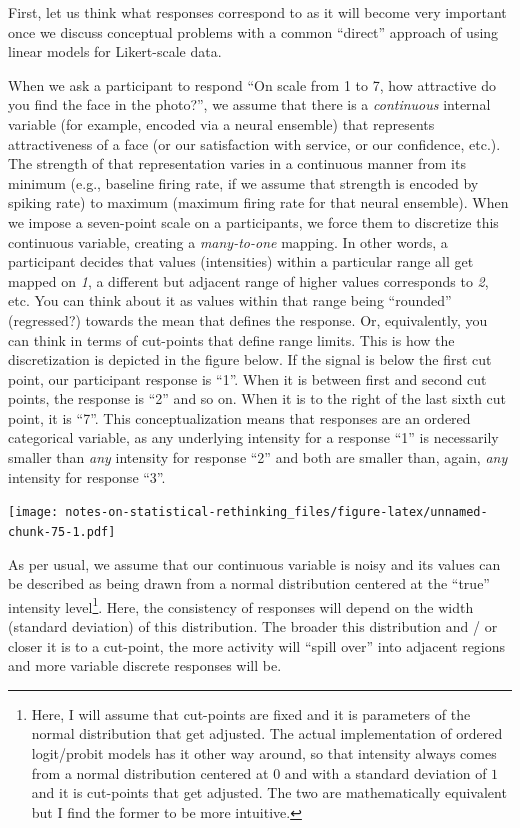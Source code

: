 \documentclass[
]{book}
\begin{document}
First, let us think what responses correspond to as it will become very important once we discuss conceptual problems with a common ``direct'' approach of using linear models for Likert-scale data.

When we ask a participant to respond ``On scale from 1 to 7, how attractive do you find the face in the photo?'', we assume that there is a \emph{continuous} internal variable (for example, encoded via a neural ensemble) that represents attractiveness of a face (or our satisfaction with service, or our confidence, etc.). The strength of that representation varies in a continuous manner from its minimum (e.g., baseline firing rate, if we assume that strength is encoded by spiking rate) to maximum (maximum firing rate for that neural ensemble). When we impose a seven-point scale on a participants, we force them to discretize this continuous variable, creating a \emph{many-to-one} mapping. In other words, a participant decides that values (intensities) within a particular range all get mapped on \emph{1}, a different but adjacent range of higher values corresponds to \emph{2}, etc. You can think about it as values within that range being ``rounded'' (regressed?) towards the mean that defines the response. Or, equivalently, you can think in terms of cut-points that define range limits. This is how the discretization is depicted in the figure below. If the signal is below the first cut point, our participant response is ``1''. When it is between first and second cut points, the response is ``2'' and so on. When it is to the right of the last sixth cut point, it is ``7''. This conceptualization means that responses are an ordered categorical variable, as any underlying intensity for a response ``1'' is necessarily smaller than \emph{any} intensity for response ``2'' and both are smaller than, again, \emph{any} intensity for response ``3''.

\texttt{[image: notes-on-statistical-rethinking\_files/figure-latex/unnamed-chunk-75-1.pdf]}

As per usual, we assume that our continuous variable is noisy and its values can be described as being drawn from a normal distribution centered at the ``true'' intensity level\footnote{Here, I will assume that cut-points are fixed and it is parameters of the normal distribution that get adjusted. The actual implementation of ordered logit/probit models has it other way around, so that intensity always comes from a normal distribution centered at \(0\) and with a standard deviation of \(1\) and it is cut-points that get adjusted. The two are mathematically equivalent but I find the former to be more intuitive.}. Here, the consistency of responses will depend on the width (standard deviation) of this distribution. The broader this distribution and / or closer it is to a cut-point, the more activity will ``spill over'' into adjacent regions and more variable discrete responses will be.
\end{document}
